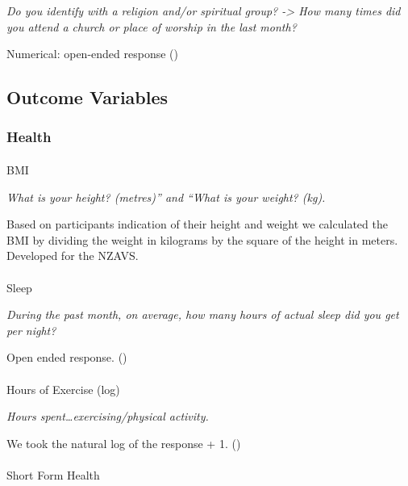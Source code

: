 \documentclass[
  single column]{article}
\makeatletter
\let\oldparagraph\paragraph
\renewcommand{\paragraph}{
    \@ifstar
      \xxxParagraphStar
      \xxxParagraphNoStar
  }
\newcommand{\xxxParagraphStar}[1]{\oldparagraph*{#1}\mbox{}}
\newcommand{\xxxParagraphNoStar}[1]{\oldparagraph{#1}\mbox{}}
\makeatother
\begin{document}
\emph{Do you identify with a religion and/or spiritual group?
-\textgreater{} How many times did you attend a church or place of
worship in the last month?}

Numerical: open-ended response ()

\subsection{Outcome Variables}\label{outcome-variables}

\subsubsection{Health}\label{health-1}

\paragraph{BMI}\label{bmi-1}

\emph{What is your height? (metres)'' and ``What is your weight? (kg).}

Based on participants indication of their height and weight we
calculated the BMI by dividing the weight in kilograms by the square of
the height in meters. Developed for the NZAVS.

\paragraph{Sleep}\label{sleep}

\emph{During the past month, on average, how many hours of actual sleep
did you get per night?}

Open ended response. ()

\paragraph{Hours of Exercise (log)}\label{hours-of-exercise-log-1}

\emph{Hours spent\ldots exercising/physical activity.}

We took the natural log of the response + 1.
()

\paragraph{Short Form Health}\label{short-form-health}
\end{document}
